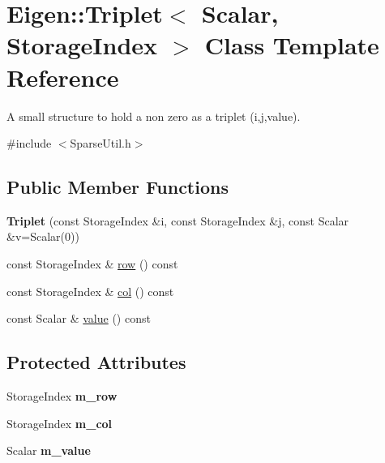 \hypertarget{class_eigen_1_1_triplet}{}\section{Eigen\+::Triplet$<$ Scalar, Storage\+Index $>$ Class Template Reference}
\label{class_eigen_1_1_triplet}


A small structure to hold a non zero as a triplet (i,j,value).  




{\ttfamily \#include $<$Sparse\+Util.\+h$>$}

\subsection*{Public Member Functions}
\begin{DoxyCompactItemize}
\item 
\mbox{\label{class_eigen_1_1_triplet_aba38920ed9d7e9b917cab2f701f9ca62}} 
{\bfseries Triplet} (const Storage\+Index \&i, const Storage\+Index \&j, const Scalar \&v=Scalar(0))
\item 
const Storage\+Index \& \mbox{\hyperlink{class_eigen_1_1_triplet_ae88b0ad6d31daa53e298b9cc4201fdee}{row}} () const
\item 
const Storage\+Index \& \mbox{\hyperlink{class_eigen_1_1_triplet_a3531e3e2098507a069a368d72d46471e}{col}} () const
\item 
const Scalar \& \mbox{\hyperlink{class_eigen_1_1_triplet_a003ea53c6559b106406f7916d6610547}{value}} () const
\end{DoxyCompactItemize}
\subsection*{Protected Attributes}
\begin{DoxyCompactItemize}
\item 
\mbox{\label{class_eigen_1_1_triplet_a131514b3dd98e819d0e95bed8061b89c}} 
Storage\+Index {\bfseries m\+\_\+row}
\item 
\mbox{\label{class_eigen_1_1_triplet_a5c18e694e1d03d97c6be31adc0b32a04}} 
Storage\+Index {\bfseries m\+\_\+col}
\item 
\mbox{\label{class_eigen_1_1_triplet_ad50e9b16b92ffa57c5190d3285fca830}} 
Scalar {\bfseries m\+\_\+value}
\end{DoxyCompactItemize}


